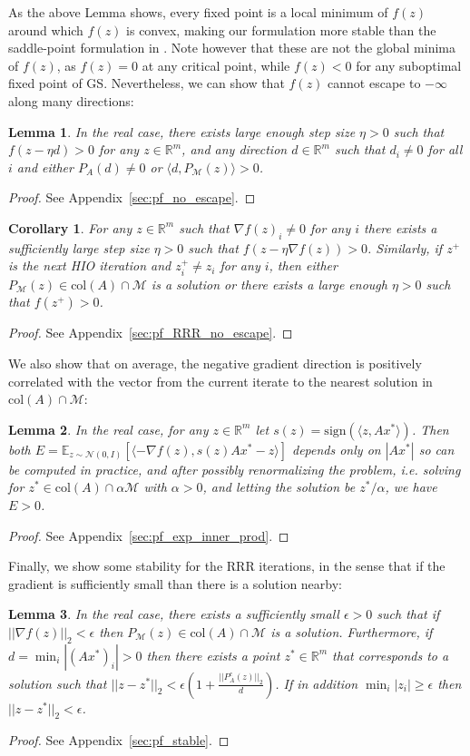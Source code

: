 \documentclass[journal]{IEEEtran}
\newtheorem{lemma}{Lemma}
\newtheorem{corollary}{Corollary}
\theoremstyle{definition}
\theoremstyle{remark}
\theoremstyle{definition}
\theoremstyle{problem}
\theoremstyle{definition}
\newcommand{\blem}{\begin{lemma}}
\newcommand{\elem}{\end{lemma}}
\newcommand{\bpof}{\begin{proof}}
\newcommand{\epof}{\end{proof}}
\newcommand{\bcor}{\begin{corollary}}
\newcommand{\ecor}{\end{corollary}}
\newcommand{\col}{\text{col}}
\newcommand{\sign}{\text{sign}}
\newcommand{\RR}{\mathbb{R} }
\newcommand{\MM}{\mathcal{M}}
\newcommand{\EE}{\mathbb{E}}
\begin{document}
As the above Lemma shows, every fixed point is a local minimum of $f(z)$ around which $f(z)$ is convex, making our formulation more stable than the saddle-point formulation in \cite{Marchesini2007}. Note however that these are not the global minima of $f(z)$, as $f(z)=0$ at any critical point, while $f(z)<0$ for any suboptimal fixed point of GS. Nevertheless, we can show that $f(z)$ cannot escape to $-\infty$ along many directions:

\blem\label{lem:no_escape} In the real case, there exists large enough step size $\eta>0$ such that $f(z-\eta d) > 0$ for any $z\in\RR^m$, and any direction $d\in\RR^m$ such that $d_i\neq 0$ for all $i$ and either $P_A(d)\neq 0$ or $\langle d, P_{\MM}(z)\rangle > 0$. \elem
\bpof See Appendix~\ref{sec:pf_no_escape}. \epof

\bcor\label{cor:RRR_no_escape} For any $z\in\RR^m$ such that $\nabla f(z)_i\neq 0$ for any $i$ there exists a sufficiently large step size $\eta>0$ such that $f(z-\eta\nabla f(z)) > 0$. Similarly, if $z^+$ is the next HIO iteration and $z^+_i\neq z_i$ for any $i$, then either $P_{\MM}(z)\in\col(A)\cap\MM$ is a solution or there exists a large enough $\eta>0$ such that $f(z^+)>0$. \ecor
\bpof See Appendix~\ref{sec:pf_RRR_no_escape}. \epof

We also show that on average, the negative gradient direction is positively correlated with the vector from the current iterate to the nearest solution in $\col(A)\cap\MM$:
\blem\label{lem:exp_inner_prod} In the real case, for any $z\in\RR^m$ let $s(z) = \sign\left(\langle z, Ax^*\rangle\right)$. Then both $E = \EE_{z\sim\mathcal{N}(0, I)}\left[\langle -\nabla f(z), s(z)Ax^*-z\rangle\right]$ depends only on $|Ax^*|$ so can be computed in practice, and after possibly renormalizing the problem, i.e. solving for $z^*\in\col(A)\cap\alpha\MM$ with $\alpha>0$, and letting the solution be $z^*/\alpha$, we have $E>0$. \elem
\bpof See Appendix~\ref{sec:pf_exp_inner_prod}. \epof

Finally, we show some stability for the RRR iterations, in the sense that if the gradient is sufficiently small than there is a solution nearby:
\blem\label{lem:stable} In the real case, there exists a sufficiently small $\epsilon>0$ such that if $||\nabla f(z)||_2< \epsilon$ then $P_{\MM}(z)\in\col(A)\cap\MM$ is a solution. Furthermore, if $d=\min_i|(Ax^*)_i|>0$ then there exists a point $z^*\in\RR^m$ that corresponds to a solution such that $||z-z^*||_2<\epsilon\left(1 + \frac{||P_A^c(z)||_2}{d}\right)$. If in addition $\min_i|z_i|\geq\epsilon$ then $||z-z^*||_2< \epsilon$.\elem
\bpof See Appendix~\ref{sec:pf_stable}. \epof
\end{document}

